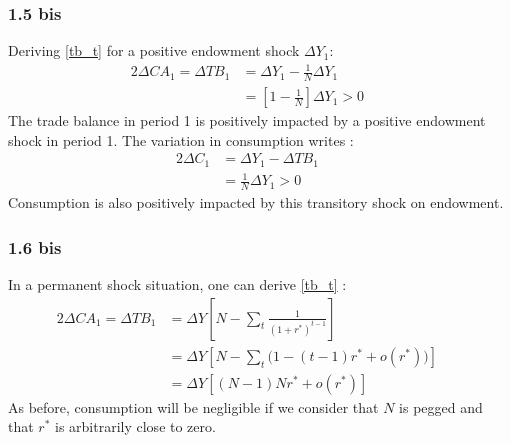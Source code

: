 \documentclass{article}
\begin{document}
\subsubsection*{1.5 bis}
Deriving \eqref{tb_t} for a positive endowment shock $\Delta Y_1$:
\begin{alignat*}{2}
    \Delta CA_1 = \Delta TB_1 &= \Delta Y_1 - \frac{1}{N} \Delta Y_1 \quad&\\
    &= \left[ 1 - \frac{1}{N}\right] \Delta Y_1 > 0 \quad&
    \label{Delta_tb}
\end{alignat*}
The trade balance in period 1 is positively impacted by a positive endowment shock in period 1. The variation in consumption writes :
\begin{alignat*}{2}
    \Delta C_1 &= \Delta Y_1 - \Delta TB_1 \quad&\\
    &= \frac{1}{N} \Delta Y_1 > 0 \quad&
\end{alignat*}
Consumption is also positively impacted by this transitory shock on endowment.
\subsubsection*{1.6 bis}
In a permanent shock situation, one can derive \eqref{tb_t} :
\begin{alignat*}{2}
    \Delta CA_1 = \Delta TB_1 &= \Delta Y \left[N - \sum_t \frac{1}{(1+r^*)^{t-1}} \right]\quad&\\
    &= \Delta Y \left[N - \sum_t \Big(1 - (t-1)r^* + o(r^*) \Big)\right] \quad&\\
    &= \Delta Y \left[(N-1)N r^* + o(r^*) \right]\quad&
\end{alignat*}
As before, consumption will be negligible if we consider that $N$ is pegged and that $r^*$ is arbitrarily close to zero.
\end{document}
